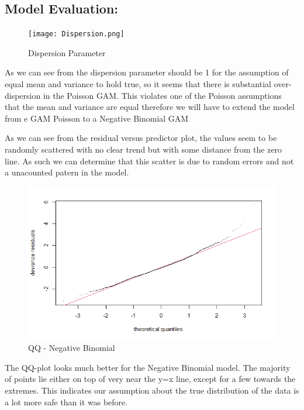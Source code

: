 \documentclass[
  letterpaper,
  DIV=11,
  numbers=noendperiod]{scrartcl}
\begin{document}
\hypertarget{model-evaluation}{%
\subsection{Model Evaluation:}\label{model-evaluation}}

\begin{figure}

{\centering \texttt{[image: Dispersion.png]}

}

\caption{Dispersion Parameter}

\end{figure}

As we can see from the dispersion parameter should be 1 for the
assumption of equal mean and variance to hold true, so it seems that
there is substantial over-dispersion in the Poisson GAM. This violates
one of the Poisson assumptions that the mean and variance are equal
therefore we will have to extend the model from e GAM Poisson to a
Negative Binomial GAM

As we can see from the residual versus predictor plot, the values seem
to be randomly scattered with no clear trend but with some distance from
the zero line. As such we can determine that this scatter is due to
random errors and not a unacounted patern in the model.

\begin{figure}

{\centering \includegraphics{QQNB.png}

}

\caption{QQ - Negative Binomial}

\end{figure}

The QQ-plot looks much better for the Negative Binomial model. The
majority of points lie either on top of very near the y=x line, except
for a few towards the extremes. This indicates our assumption about the
true distribution of the data is a lot more safe than it was before.
\end{document}
